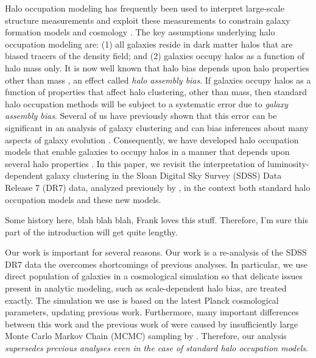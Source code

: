 \documentclass[usenatbib,usegraphicx,letterpaper]{mn2e}
\begin{document}
Halo occupation modeling has frequently 
been used to interpret large-scale structure measurements and exploit these measurements 
to constrain galaxy formation models and cosmology \citep[e.g.,][]{yang03,tinker05,zehavi05a,
porciani06,vdBosch07,Zheng07,conroy_wechsler09,yang09b,zehavi_etal11,guo_etal11b,
wake_etal11,yang11a,yang12,leauthaud_etal12,tinker_etal13,cacciato_etal13,
more_etal13,guo_etal14,zu_mandelbaum15b}. The key assumptions underlying 
halo occupation modeling are: (1) all galaxies reside in dark matter halos that are biased 
tracers of the density field; and (2) galaxies occupy halos as a function of halo mass 
only. It is now well known that halo bias depends upon halo properties other than mass
\citep[e.g.][]{gao_etal05,wechsler06,gao_white07,zentner07,dalal_etal08,lacerna11}, 
an effect called {\em halo assembly bias}. If galaxies occupy halos as a function of properties 
that affect halo clustering, other than mass, then standard halo occupation methods will be subject to a 
systematic error due to {\em galaxy assembly bias}. Several of us have previously shown that 
this error can be significant in an analysis of galaxy clustering and can bias inferences 
about many aspects of galaxy evolution \citep{zentner_etal14}. Consequently, we have 
developed halo occupation models that enable galaxies to occupy halos in a manner 
that depends upon several halo properties \citep{hearin_etal16}. In this paper, we 
revisit the interpretation of luminosity-dependent galaxy clustering in the Sloan Digital Sky 
Survey (SDSS) Data Release 7 (DR7) data, analyzed previously by \citet{zehavi_etal11}, in the context 
both standard halo occupation models and these new models.

Some history here, blah blah blah, Frank loves this stuff. Therefore, I'm sure this part of the introduction 
will get quite lengthy.

Our work is important for several reasons. Our work is a re-analysis of the SDSS DR7 data 
the overcomes shortcomings of previous analyses. In particular, we use direct population of galaxies 
in a cosmological simulation so that delicate issues present in analytic modeling, such as scale-dependent 
halo bias, are treated exactly.  The simulation we use is based on the latest Planck cosmological parameters, 
updating previous work. Furthermore, many important differences between this work and the previous 
work of \citet{zehavi_etal11} were caused by insufficiently large Monte Carlo Markov Chain (MCMC) sampling 
by \citet[][Z. Zheng \& I. Zehavi, Private Communication]{zehavi_etal11}. Therefore, our analysis 
{\em supersedes previous analyses even in the case of standard halo occupation models}.
\end{document}
